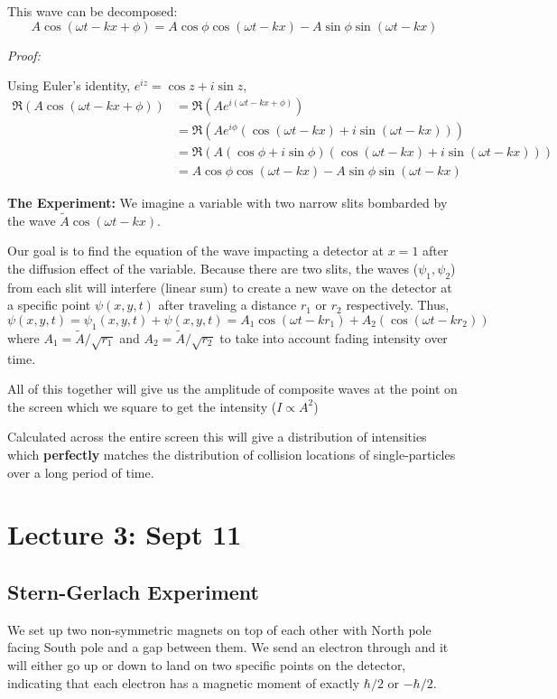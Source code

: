 \documentclass[12pt]{article}
\begin{document}
This wave can be decomposed:
\[A\cos(\omega t - kx + \phi) = A\cos \phi \cos(\omega t - kx) - A\sin \phi \sin(\omega t - kx)\]

\emph{Proof:}

Using Euler's identity, $e^{iz} = \cos z + i\sin z$, 
\begin{align*}
    \Re(A \cos(\omega t - kx + \phi)) &= \Re(A e^{i(\omega t - kx + \phi)})\\
    &= \Re(Ae^{i \phi} (\cos(\omega t - kx) + i\sin (\omega t - kx)))\\
    &= \Re(A(\cos \phi + i \sin \phi) (\cos(\omega t - kx) + i\sin (\omega t - kx)))\\
    &=  A\cos \phi \cos(\omega t - kx) - A\sin \phi \sin(\omega t - kx)
\end{align*}

\textbf{The Experiment:}
We imagine a variable with two narrow slits bombarded by the wave $\tilde A \cos(\omega t - kx)$.

Our goal is to find the equation of the wave impacting a detector at $x=1$ after the diffusion effect of the variable. Because there are two slits, the waves ($\psi_1, \psi_2$) from each slit will interfere (linear sum) to create a new wave on the detector at a specific point $\psi(x, y, t)$ after traveling a distance $r_1$ or $r_2$ respectively. Thus,
\[\psi(x, y, t) = \psi_1(x, y, t) + \psi(x, y, t) = A_1 \cos(\omega t - k r_1) + A_2(\cos(\omega t - k r_2))\]
where $A_1 = \tilde A/\sqrt{r_1}$ and $A_2 = \tilde A/\sqrt{r_2}$ to take into account fading intensity over time.

All of this together will give us the amplitude of composite waves at the point on the screen which we square to get the intensity ($I \propto A^2$)

Calculated across the entire screen this will give a distribution of intensities which \textbf{perfectly} matches the distribution of collision locations of single-particles over a long period of time. 

\section*{Lecture 3: Sept 11}
\subsection*{Stern-Gerlach Experiment}
We set up two non-symmetric magnets on top of each other with North pole facing South pole and a gap between them. We send an electron through and it will either go up or down to land on two specific points on the detector, indicating that each electron has a magnetic moment of exactly $\hbar/2$ or $-\hbar/2$.
\end{document}

